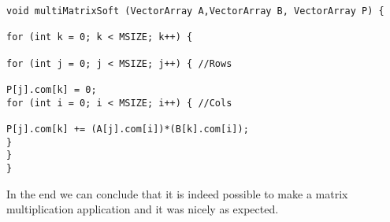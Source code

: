 \begin{lstlisting}[style=customc++, caption= displayMatrix ,
label={lst:masterslaveadaptersource}]
   void multiMatrixSoft (VectorArray A,VectorArray B, VectorArray P) {

for (int k = 0; k < MSIZE; k++) {

for (int j = 0; j < MSIZE; j++) { //Rows

P[j].com[k] = 0;
for (int i = 0; i < MSIZE; i++) { //Cols

P[j].com[k] += (A[j].com[i])*(B[k].com[i]);
}
}
}
\end{lstlisting}

In the end we can conclude that it is indeed possible to make a matrix multiplication application and it was nicely as expected.
